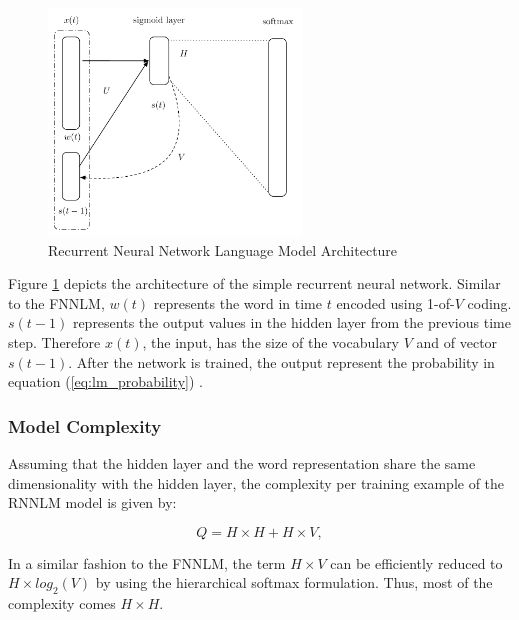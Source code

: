 \begin{figure}[hptb!]
    \centering
    \includegraphics[width=0.6\textwidth]{images/mikolov-rnnlm.pdf} 
    \caption{Recurrent Neural Network Language Model Architecture}
    \label{fig:RNNLM_architecture}
\end{figure}



Figure \ref{fig:RNNLM_architecture} depicts the architecture of the simple
recurrent neural network. Similar to the \ac{FNNLM},    $w(t)$ represents the word in time $t$ encoded using 1-of-$V$ coding.  $s(t-1)$ represents the output values in the
hidden layer from the previous time step. Therefore $x(t)$, the input, has
the size of the vocabulary $V$ and of vector $s(t-1)$. After the network is
trained, the output represent the probability  in  equation
(\ref{eq:lm_probability})  \cite{mikolovphd2012}. %


\subsubsection{Model Complexity}
\label{sec:sub:sub:mikolov_rnnlm_complexity}

Assuming that the hidden layer and the word representation share the same
dimensionality with the hidden layer, the complexity per training example of the \ac{RNNLM} model is
given by:


\begin{equation} Q = H \times H + H \times V,   \end{equation}

In a similar fashion to the \ac{FNNLM}, the term $H \times V$ can be
efficiently reduced to $H \times log_2(V)$ by using the hierarchical softmax
formulation. Thus, most of the complexity comes $H \times H$.

